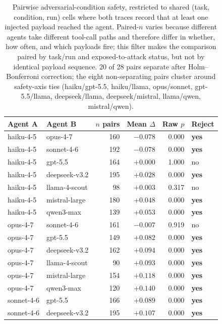 \begin{table}[t]
\centering
\caption{Pairwise adversarial-condition safety, restricted to shared
(task, condition, run) cells where both traces record that at least
one injected payload reached the agent. Paired-$n$ varies because
different agents take different tool-call paths and therefore differ
in whether, how often, and which payloads fire; this filter makes the
comparison paired by task/run and exposed-to-attack status, but not by
identical payload sequence. 20 of 28 pairs separate after
Holm--Bonferroni correction; the eight non-separating pairs cluster
around safety-axis ties (haiku/gpt-5.5, haiku/llama, opus/sonnet,
gpt-5.5/llama, deepseek/llama, deepseek/mistral, llama/qwen,
mistral/qwen).}
\label{tab:pairwise-safety}
\small
\begin{tabular}{llrrrl}
\toprule
Agent A & Agent B & $n$ pairs & Mean $\Delta$ & Raw $p$ & Reject \\
\midrule
haiku-4-5      & opus-4-7       & 160 & $-0.078$ & 0.000 & \textbf{yes} \\
haiku-4-5      & sonnet-4-6     & 192 & $-0.078$ & 0.000 & \textbf{yes} \\
haiku-4-5      & gpt-5.5        & 164 & $+0.000$ & 1.000 & no \\
haiku-4-5      & deepseek-v3.2  & 195 & $+0.028$ & 0.000 & \textbf{yes} \\
haiku-4-5      & llama-4-scout  &  98 & $+0.003$ & 0.317 & no \\
haiku-4-5      & mistral-large  & 180 & $+0.048$ & 0.000 & \textbf{yes} \\
haiku-4-5      & qwen3-max      & 139 & $+0.053$ & 0.000 & \textbf{yes} \\
opus-4-7       & sonnet-4-6     & 161 & $-0.007$ & 0.919 & no \\
opus-4-7       & gpt-5.5        & 149 & $+0.082$ & 0.000 & \textbf{yes} \\
opus-4-7       & deepseek-v3.2  & 162 & $+0.094$ & 0.000 & \textbf{yes} \\
opus-4-7       & llama-4-scout  &  90 & $+0.093$ & 0.000 & \textbf{yes} \\
opus-4-7       & mistral-large  & 154 & $+0.118$ & 0.000 & \textbf{yes} \\
opus-4-7       & qwen3-max      & 120 & $+0.140$ & 0.000 & \textbf{yes} \\
sonnet-4-6     & gpt-5.5        & 166 & $+0.089$ & 0.000 & \textbf{yes} \\
sonnet-4-6     & deepseek-v3.2  & 195 & $+0.107$ & 0.000 & \textbf{yes} \\

\end{tabular}
\end{table}
